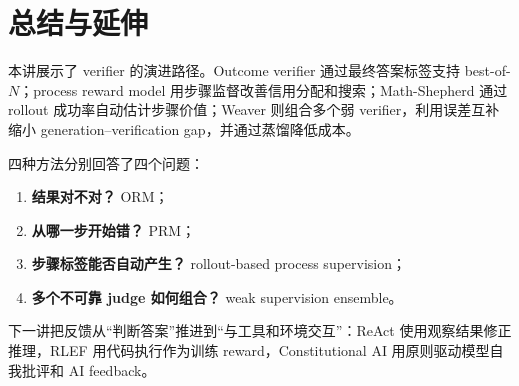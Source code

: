 \section{总结与延伸}

本讲展示了 verifier 的演进路径。Outcome verifier 通过最终答案标签支持 best-of-$N$；process reward model 用步骤监督改善信用分配和搜索；Math-Shepherd 通过 rollout 成功率自动估计步骤价值；Weaver 则组合多个弱 verifier，利用误差互补缩小 generation--verification gap，并通过蒸馏降低成本。

四种方法分别回答了四个问题：

\begin{enumerate}
    \item \textbf{结果对不对？} ORM；
    \item \textbf{从哪一步开始错？} PRM；
    \item \textbf{步骤标签能否自动产生？} rollout-based process supervision；
    \item \textbf{多个不可靠 judge 如何组合？} weak supervision ensemble。
\end{enumerate}

下一讲把反馈从“判断答案”推进到“与工具和环境交互”：ReAct 使用观察结果修正推理，RLEF 用代码执行作为训练 reward，Constitutional AI 用原则驱动模型自我批评和 AI feedback。


